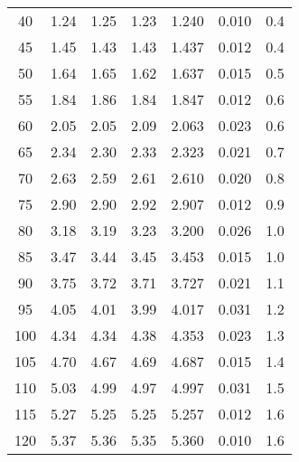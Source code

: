 \begin{table}[H]
\begin{tabular}{
      S[table-format=3.0] 
      S[table-format=1.3] S[table-format=1.3] S[table-format=1.3]
      S[table-format=1.4] S[table-format=1.4] S[table-format=1.3]
      }
      40  & 1.24  & 1.25  &  1.23  &  1.240  & 0.010 & 0.4   \\
      45  & 1.45  & 1.43  &  1.43  &  1.437  & 0.012 & 0.4   \\
      50  & 1.64  & 1.65  &  1.62  &  1.637  & 0.015 & 0.5   \\
      55  & 1.84  & 1.86  &  1.84  &  1.847  & 0.012 & 0.6   \\
      60  & 2.05  & 2.05  &  2.09  &  2.063  & 0.023 & 0.6   \\
      65  & 2.34  & 2.30  &  2.33  &  2.323  & 0.021 & 0.7   \\
      70  & 2.63  & 2.59  &  2.61  &  2.610  & 0.020 & 0.8   \\
      75  & 2.90  & 2.90  &  2.92  &  2.907  & 0.012 & 0.9   \\
      80  & 3.18  & 3.19  &  3.23  &  3.200  & 0.026 & 1.0   \\
      85  & 3.47  & 3.44  &  3.45  &  3.453  & 0.015 & 1.0   \\
      90  & 3.75  & 3.72  &  3.71  &  3.727  & 0.021 & 1.1   \\
      95  & 4.05  & 4.01  &  3.99  &  4.017  & 0.031 & 1.2   \\
      100 & 4.34  & 4.34  &  4.38  &  4.353  & 0.023 & 1.3   \\
      105 & 4.70  & 4.67  &  4.69  &  4.687  & 0.015 & 1.4   \\
      110 & 5.03  & 4.99  &  4.97  &  4.997  & 0.031 & 1.5   \\
      115 & 5.27  & 5.25  &  5.25  &  5.257  & 0.012 & 1.6   \\
      120 & 5.37  & 5.36  &  5.35  &  5.360  & 0.010 & 1.6   \\
      \bottomrule 
    \end{tabular}
\end{table}
%

